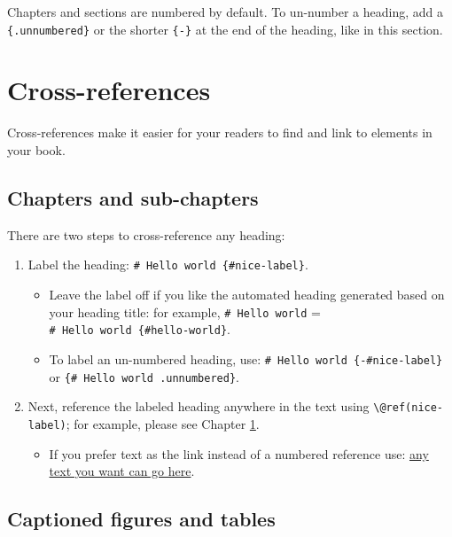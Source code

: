 \documentclass[
]{book}
\providecommand{\tightlist}{%
  \setlength{\itemsep}{0pt}\setlength{\parskip}{0pt}}
\theoremstyle{definition}
\theoremstyle{definition}
\theoremstyle{definition}
\theoremstyle{definition}
\theoremstyle{remark}
\begin{document}
Chapters and sections are numbered by default. To un-number a heading, add a \texttt{\{.unnumbered\}} or the shorter \texttt{\{-\}} at the end of the heading, like in this section.

\hypertarget{cross}{%
\chapter{Cross-references}\label{cross}}

Cross-references make it easier for your readers to find and link to elements in your book.

\hypertarget{chapters-and-sub-chapters}{%
\section{Chapters and sub-chapters}\label{chapters-and-sub-chapters}}

There are two steps to cross-reference any heading:

\begin{enumerate}
\def\labelenumi{\arabic{enumi}.}
\tightlist
\item
  Label the heading: \texttt{\#\ Hello\ world\ \{\#nice-label\}}.

  \begin{itemize}
  \tightlist
  \item
    Leave the label off if you like the automated heading generated based on your heading title: for example, \texttt{\#\ Hello\ world} = \texttt{\#\ Hello\ world\ \{\#hello-world\}}.
  \item
    To label an un-numbered heading, use: \texttt{\#\ Hello\ world\ \{-\#nice-label\}} or \texttt{\{\#\ Hello\ world\ .unnumbered\}}.
  \end{itemize}
\item
  Next, reference the labeled heading anywhere in the text using \texttt{\textbackslash{}@ref(nice-label)}; for example, please see Chapter \ref{cross}.

  \begin{itemize}
  \tightlist
  \item
    If you prefer text as the link instead of a numbered reference use: \protect\hyperlink{cross}{any text you want can go here}.
  \end{itemize}
\end{enumerate}

\hypertarget{captioned-figures-and-tables}{%
\section{Captioned figures and tables}\label{captioned-figures-and-tables}}
\end{document}

